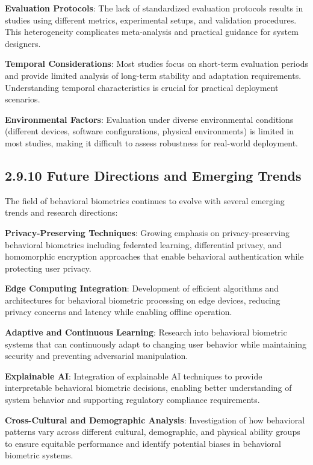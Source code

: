 \documentclass[
  12pt,
  a4paper,
]{report}
\begin{document}
\textbf{Evaluation Protocols}: The lack of standardized evaluation
protocols results in studies using different metrics, experimental
setups, and validation procedures. This heterogeneity complicates
meta-analysis and practical guidance for system designers.

\textbf{Temporal Considerations}: Most studies focus on short-term
evaluation periods and provide limited analysis of long-term stability
and adaptation requirements. Understanding temporal characteristics is
crucial for practical deployment scenarios.

\textbf{Environmental Factors}: Evaluation under diverse environmental
conditions (different devices, software configurations, physical
environments) is limited in most studies, making it difficult to assess
robustness for real-world deployment.

\subsection{2.9.10 Future Directions and Emerging
Trends}\label{future-directions-and-emerging-trends}

The field of behavioral biometrics continues to evolve with several
emerging trends and research directions:

\textbf{Privacy-Preserving Techniques}: Growing emphasis on
privacy-preserving behavioral biometrics including federated learning,
differential privacy, and homomorphic encryption approaches that enable
behavioral authentication while protecting user privacy.

\textbf{Edge Computing Integration}: Development of efficient algorithms
and architectures for behavioral biometric processing on edge devices,
reducing privacy concerns and latency while enabling offline operation.

\textbf{Adaptive and Continuous Learning}: Research into behavioral
biometric systems that can continuously adapt to changing user behavior
while maintaining security and preventing adversarial manipulation.

\textbf{Explainable AI}: Integration of explainable AI techniques to
provide interpretable behavioral biometric decisions, enabling better
understanding of system behavior and supporting regulatory compliance
requirements.

\textbf{Cross-Cultural and Demographic Analysis}: Investigation of how
behavioral patterns vary across different cultural, demographic, and
physical ability groups to ensure equitable performance and identify
potential biases in behavioral biometric systems.
\end{document}
